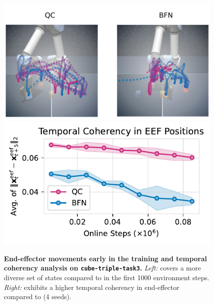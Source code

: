 \begin{figure}[t]
    \centering
\includegraphics[width=0.52\linewidth]{figures/traj_viz.pdf}
\includegraphics[width=0.47\linewidth]{figures/eefd.pdf} %

\caption{\footnotesize \textbf{End-effector movements {\color{gray}early} in the training and temporal coherency analysis on \texttt{cube-triple-task3}.} \emph{Left:}  covers a more diverse set of states compared to  in the first 1000 environment steps. \emph{Right:}  exhibits a higher temporal coherency in end-effector compared to  (4 seeds).}
\label{fig:eef}
\end{figure}

    



